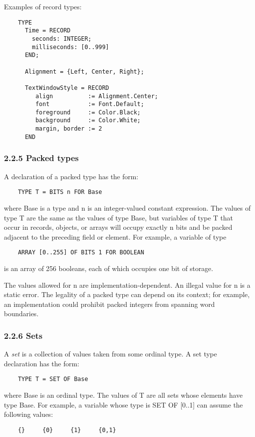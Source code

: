 \documentclass[10pt]{article}
\begin{document}
  Examples of record types: 
\begin{verbatim}
    TYPE
      Time = RECORD
        seconds: INTEGER;
        milliseconds: [0..999]
      END; 

      Alignment = {Left, Center, Right}; 

      TextWindowStyle = RECORD 
         align          := Alignment.Center;
         font           := Font.Default; 
         foreground     := Color.Black; 
         background     := Color.White; 
         margin, border := 2  
      END
\end{verbatim}



 
\subsubsection*{2.2.5 Packed types}


  A declaration of a packed type has the form: 
\begin{verbatim}
    TYPE T = BITS n FOR Base
\end{verbatim}
 where Base is a type and n is an integer-valued constant expression. The values of type T are the same as the values of type Base, but variables of type T that occur in records, objects, or arrays will occupy exactly n bits and be packed adjacent to the preceding field or element. For example, a variable of type 
\begin{verbatim}
    ARRAY [0..255] OF BITS 1 FOR BOOLEAN
\end{verbatim}
 is an array of 256 booleans, each of which occupies one bit of storage. 


  The values allowed for n are implementation-dependent. An illegal value for n is a static error. The legality of a packed type can depend on its context; for example, an implementation could prohibit packed integers from spanning word boundaries. 


 
\subsubsection*{2.2.6 Sets}


  A \emph{set}
 is a collection of values taken from some ordinal type. A set type declaration has the form: 
\begin{verbatim}
    TYPE T = SET OF Base
\end{verbatim}
 where Base is an ordinal type. The values of T are all sets whose elements have type Base. For example, a variable whose type is SET OF [0..1] can assume the following values: 
\begin{verbatim}
    {}     {0}     {1}     {0,1}
\end{verbatim}
\end{document}
